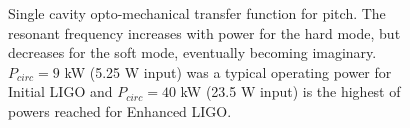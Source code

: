 


\begin{figure}
\begin{centering}
\caption{Single cavity opto-mechanical transfer function for
  pitch. The resonant frequency increases with power for the hard
  mode, but decreases for the soft mode, eventually becoming
  imaginary. $P_{circ} = 9$ kW (5.25 W input) was a typical operating power for
  Initial LIGO and $P_{circ} = 40$ kW (23.5 W input) is the highest of powers reached
for Enhanced LIGO.}
\label{fig:optomechhardsoft}
\end{centering}
\end{figure}




